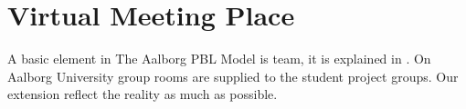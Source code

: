 \section{Virtual Meeting Place}
\label{sec:virtualMeetingPlace}
A basic element in The Aalborg PBL Model is team, it is explained in . 
On Aalborg University group rooms are supplied to the student project groups. 
Our extension reflect the reality as much as possible.  














